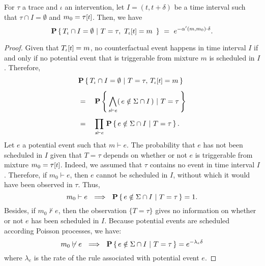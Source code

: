 \begin{theorem*}
  For $\tau$ a trace
  and $\iota$ an intervention, let $I = (t, t+\delta)$ be a time interval
  such that $\tau \cap I = \emptyset$ and $m_0 =
  \TSTATE{t}{\tau}$. Then, we have
  \[\CProb{ \ATRAJ{} \cap I = \emptyset }{ T=\tau,\
      \TSTATE{t}{\ATRAJ{}} = m\ }
    \ =\ e^{-\alpha'(m, m_0) \cdot \delta}.
  \]
\end{theorem*}
\begin{proof}

  Given that $\TSTATE{t}{\ATRAJ{}} = m$, no counterfactual event
  happens in time interval $I$ if and only if no potential event that
  is triggerable from mixture $m$ is scheduled in $I$. Therefore,
  \vskip 0.0cm
  \begin{equation}\label{eqn:scheduled-decomposition}
    \begin{aligned}
      &\CProb{ \ATRAJ{} \cap I = \emptyset } { T=\tau,\,
        \TSTATE{t}{\ATRAJ{}} = m }
      \\[0.4em]
      &= \quad \CProb{ \bigwedge_{s \vdash e} (\,e \notin \Sigma \cap
        I \,) }{ T=\tau }
      \\[0.4em]
      &= \quad \prod_{s \vdash e}\, \CProb{e \notin \Sigma \cap I }{
        T=\tau }.
    \end{aligned}
  \end{equation}
  \vskip 0.2cm Let $e$ a potential event such that $m \vdash e$. The
  probability that $e$ has not been scheduled in $I$ given that
  $T=\tau$ depends on whether or not $e$ is triggerable from mixture
  $m_0 = \TSTATE{t}{\tau}$. Indeed, we assumed that $\tau$ contains no
  event in time interval $I$. Therefore, if $m_0 \vdash e$, then $e$
  cannot be scheduled in $I$, without which it would have been
  observed in $\tau$.  Thus,
  \begin{equation}\label{eqn:pscheduled1}
    m_0 \vdash e \ \ \Longrightarrow\ \ \mathbf{P} \left\{\, e \notin \Sigma \cap I \ |\ T=\tau  \,\right\} = 1.
  \end{equation}
  Besides, if $m_0 \not\vdash e$, then the observation $\{ T=\tau \}$
  gives no information on whether or not $e$ has been scheduled in
  $I$. Because potential events are scheduled according Poisson
  processes, we have:
  \begin{equation}\label{eqn:pscheduled2}
    m_0 \not\vdash e \ \ \Longrightarrow\ \ \mathbf{P} \left\{\, e \notin \Sigma \cap I \ |\ 
      T=\tau  \,\right\} = e^{-\lambda_e \delta}
  \end{equation} where $\lambda_e$ is the rate of the rule associated with potential event $e$.

\end{proof}
